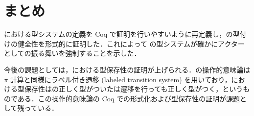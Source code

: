 








\section{まとめ}

\api における型システムの定義を Coq で証明を行いやすいように再定義し，\api の型付けの健全性を形式的に証明した．これによって \api の型システムが確かにアクターとしての振る舞いを強制することを示した．

今後の課題としては，\api における型保存性の証明が上げられる．\api の操作的意味論は $\pi$ 計算と同様にラベル付き遷移 (labeled transition system) を用いており，\api における型保存性は\api の正しく型がついた\conf は遷移を行っても正しく型がつく，というものである．この操作的意味論の Coq での形式化および型保存性の証明が課題として残っている．

